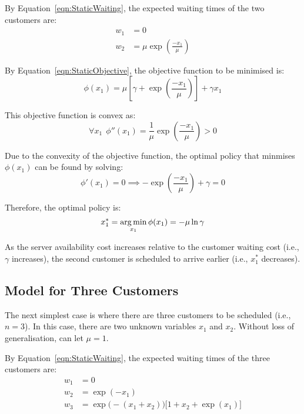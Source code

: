 By Equation~\ref{eqn:StaticWaiting}, the expected waiting times of the two customers are:
\begin{align}
	w_{1} & = 0 \\
	w_{2} & = \mu \exp \left( \frac{- x_{1}}{\mu} \right)
\end{align}

By Equation~\ref{eqn:StaticObjective}, the objective function to be minimised is:
\begin{equation}
	\phi (x_{1}) = \mu \left[ \gamma + \exp \left( \frac{- x_{1}}{\mu} \right) \right] + \gamma x_{1}
\end{equation}

This objective function is convex as:
\begin{equation}
	\forall x_{1} \ \ \phi'' (x_{1}) = \frac{1}{\mu} \exp \left( \frac{- x_{1}}{\mu} \right) > 0
\end{equation}

Due to the convexity of the objective function, the optimal policy that minmises $\phi (x_{1})$ can be found by solving:
\begin{equation}
	\phi' (x_{1}) = 0 \implies - \exp \left( \frac{- x_{1}}{\mu} \right) + \gamma = 0
\end{equation}

Therefore, the optimal policy is:
\begin{equation}
	x_{1}^{*} = \operatorname*{arg\,min}_{x_{1}} \phi (x_{1}) = - \mu \ln \gamma
\end{equation}

As the server availability cost increases relative to the customer waiting cost (i.e., $\gamma$ increases), the second customer is scheduled to arrive earlier (i.e., $x_{1}^{*}$ decreases).

\subsection{Model for Three Customers}
The next simplest case is where there are three customers to be scheduled (i.e., $n = 3$). In this case, there are two unknown variables $x_{1}$ and $x_{2}$. Without loss of generalisation, can let $\mu = 1$.

By Equation~\ref{eqn:StaticWaiting}, the expected waiting times of the three customers are:
\begin{align}
	w_{1} & = 0 \\
	w_{2} & = \exp (- x_{1}) \\
	w_{3} & = \exp \Big( - (x_{1} + x_{2}) \Big) \Big[ 1 + x_{2} + \exp (x_{1}) \Big]
\end{align}

